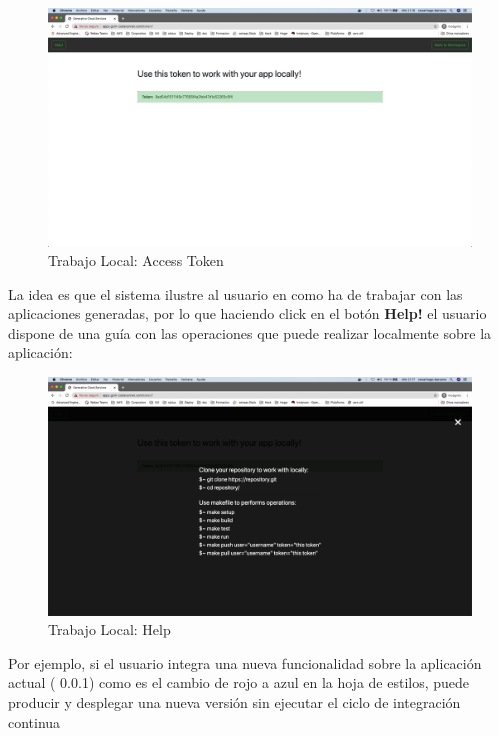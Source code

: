 \documentclass[a4paper,11pt]{book}
\begin{document}
   \begin{figure}[H]
\centering
\includegraphics[scale=0.2]{imagenes/casouso/3_3.png}
\caption{ Trabajo Local:  Access Token  }
\end{figure}

La idea es que el sistema ilustre al usuario en como ha de trabajar con las aplicaciones generadas, por lo  que haciendo click en el botón \textbf{Help!} el usuario dispone de una guía con las operaciones que puede realizar localmente sobre la aplicación:

   \begin{figure}[H]
\centering
\includegraphics[scale=0.2]{imagenes/casouso/3_4.png}
\caption{   Trabajo Local: Help}
\end{figure}

Por ejemplo, si el usuario integra una nueva funcionalidad sobre la aplicación actual ( 0.0.1) como es el cambio de rojo a azul en la hoja de estilos, puede producir y desplegar una nueva versión sin ejecutar el ciclo de integración continua
\end{document}
